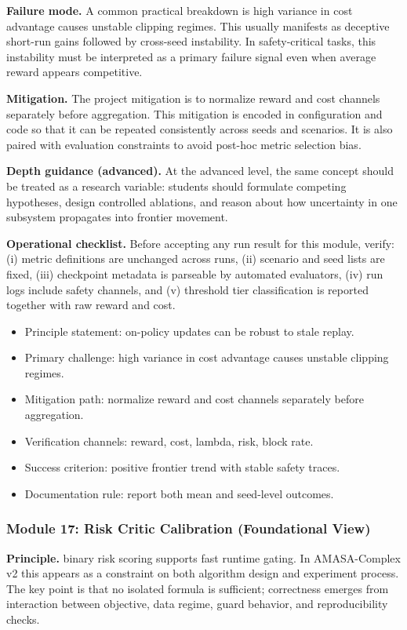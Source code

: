 \documentclass[conference]{IEEEtran}
\begin{document}
\textbf{Failure mode.} A common practical breakdown is high variance in cost advantage causes unstable clipping regimes. This usually manifests as deceptive short-run gains followed by cross-seed instability. In safety-critical tasks, this instability must be interpreted as a primary failure signal even when average reward appears competitive.

\textbf{Mitigation.} The project mitigation is to normalize reward and cost channels separately before aggregation. This mitigation is encoded in configuration and code so that it can be repeated consistently across seeds and scenarios. It is also paired with evaluation constraints to avoid post-hoc metric selection bias.

\textbf{Depth guidance (advanced).} At the advanced level, the same concept should be treated as a research variable: students should formulate competing hypotheses, design controlled ablations, and reason about how uncertainty in one subsystem propagates into frontier movement.

\textbf{Operational checklist.} Before accepting any run result for this module, verify: (i) metric definitions are unchanged across runs, (ii) scenario and seed lists are fixed, (iii) checkpoint metadata is parseable by automated evaluators, (iv) run logs include safety channels, and (v) threshold tier classification is reported together with raw reward and cost.

\begin{itemize}[leftmargin=*]
  \item Principle statement: on-policy updates can be robust to stale replay.
  \item Primary challenge: high variance in cost advantage causes unstable clipping regimes.
  \item Mitigation path: normalize reward and cost channels separately before aggregation.
  \item Verification channels: reward, cost, lambda, risk, block rate.
  \item Success criterion: positive frontier trend with stable safety traces.
  \item Documentation rule: report both mean and seed-level outcomes.
\end{itemize}


\subsubsection{Module 17: Risk Critic Calibration (Foundational View)}
\textbf{Principle.} binary risk scoring supports fast runtime gating. In AMASA-Complex v2 this appears as a constraint on both algorithm design and experiment process. The key point is that no isolated formula is sufficient; correctness emerges from interaction between objective, data regime, guard behavior, and reproducibility checks.
\end{document}
